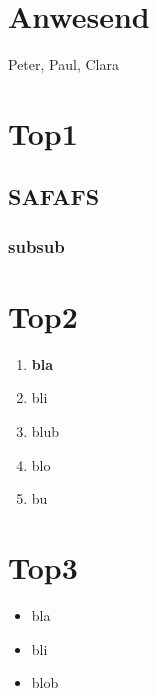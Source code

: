 \hypertarget{anwesend}{%
\section{Anwesend}\label{anwesend}}

Peter, Paul, Clara

\tableofcontents

\hypertarget{top1}{%
\section{Top1}\label{top1}}

\Blindtext[1][3]

\hypertarget{safafs}{%
\subsection{SAFAFS}\label{safafs}}

\Blindtext[2][7]

\hypertarget{subsub}{%
\subsubsection{subsub}\label{subsub}}

\Blindtext[2][5]

\hypertarget{top2}{%
\section{Top2}\label{top2}}

\begin{enumerate}
\def\labelenumi{\arabic{enumi}.}
\item
  \textbf{bla} \Blindtext[1][5]
\item
  bli
\item
  blub
\item
  blo
\item
  bu
\end{enumerate}

\hypertarget{top3}{%
\section{Top3}\label{top3}}

\begin{itemize}
\item
  bla
\item
  bli
\item
  blob
\end{itemize}

